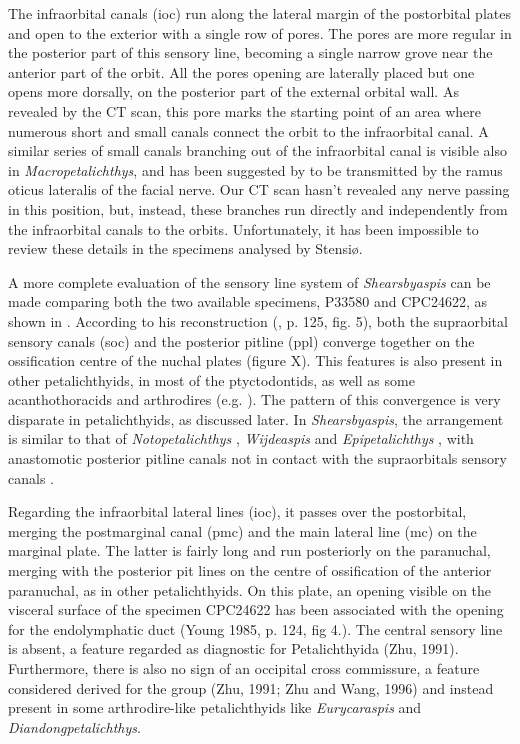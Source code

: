 \documentclass[12pt,letterpaper]{article}
\begin{document}
The infraorbital canals (ioc) run along the lateral margin of the postorbital plates and open to the exterior with a single row of pores. The pores are more regular in the posterior part of this sensory line, becoming a single narrow grove near the anterior part of the orbit. All the pores opening are laterally placed but one opens more dorsally, on the posterior part of the external orbital wall. As revealed by the CT scan, this pore marks the starting point of an area where numerous short and small canals connect the orbit to the infraorbital canal. A similar series of small canals branching out of the infraorbital canal is visible also in \textit{Macropetalichthys}, and has been suggested by \citealt{Stensi1925} to be transmitted by the ramus oticus lateralis of the facial nerve. Our CT scan hasn’t revealed any nerve passing in this position, but, instead, these branches run directly and independently from the infraorbital canals to the orbits. Unfortunately, it has been impossible to review these details in the specimens analysed by Stensi{\o}.

A more complete evaluation of the sensory line system of \textit{Shearsbyaspis} can be made comparing both the two available specimens, P33580 and  CPC24622, as shown in \citep{Young1985}. According to his reconstruction (\citealt{Young1985}, p. 125, fig. 5), both the supraorbital sensory canals (soc) and the posterior pitline (ppl) converge together on the ossification centre of the nuchal plates (figure X). This features is also present in other petalichthyids, in most of the ptyctodontids, as well as some acanthothoracids and arthrodires (e.g. \citealt{Denison1978,Young1980,Dupret2009,dupret2011skull,Trinajstic2012}). The pattern of this convergence is very disparate in petalichthyids, as discussed later. In \textit{Shearsbyaspis}, the arrangement is similar to that of \textit{Notopetalichthys} \citep{Woodward1941}, \textit{Wijdeaspis} \citep{Young1978} and \textit{Epipetalichthys} \citep{Stensi1925}, with anastomotic posterior pitline canals not in contact with the supraorbitals sensory canals \citep{Young1985}.

Regarding the infraorbital lateral lines (ioc), it passes over the postorbital, merging the postmarginal canal (pmc) and the main lateral line (mc) on the marginal plate. The latter is fairly long and run posteriorly on the paranuchal, merging with the posterior pit lines on the centre of ossification of the anterior paranuchal, as in other petalichthyids. On this plate, an opening visible on the visceral surface of the specimen CPC24622 has been associated with the opening for the endolymphatic duct (Young 1985, p. 124, fig 4.). The central sensory line is absent, a feature regarded as diagnostic for Petalichthyida (Zhu, 1991). Furthermore, there is also no sign of an occipital cross commissure, a feature considered derived for the group (Zhu, 1991; Zhu and Wang, 1996) and instead present in some arthrodire-like petalichthyids like \textit{Eurycaraspis} and \textit{Diandongpetalichthys}.
\end{document}
